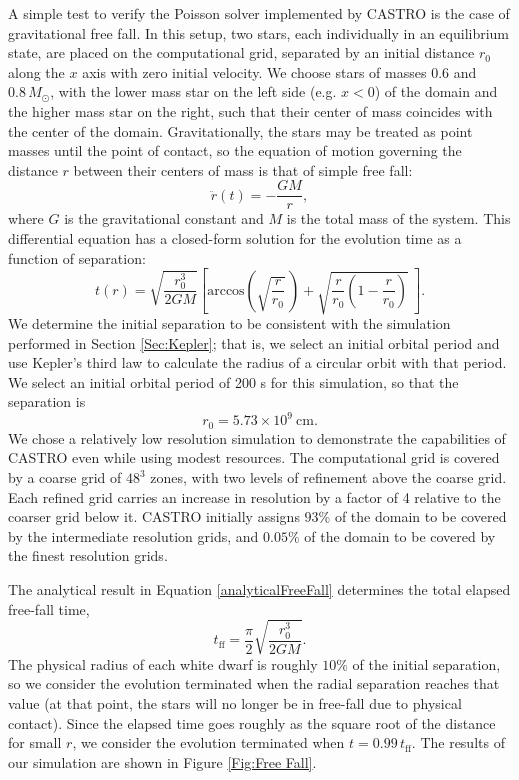 \documentclass[12pt,preprint]{aastex}
\newcommand{\MarginPar}[1]{\marginpar{\vskip-\baselineskip\raggedright\tiny\sffamily\hrule\smallskip{\color{red}#1}\par\smallskip\hrule}}
\begin{document}
A simple test to verify the Poisson solver implemented by CASTRO is
the case of gravitational free fall. In this setup, two stars, each
individually in an equilibrium state, are placed on the computational
grid, separated by an initial distance $r_0$ along the $x$ axis with
zero initial velocity. We choose stars of masses $0.6$ and $0.8\,
M_\odot$, with the lower mass star on the left side (e.g. $x < 0$) of
the domain and the higher mass star on the right, such that their
center of mass coincides with the center of the
domain. Gravitationally, the stars may be treated as point masses
until the point of contact, so the equation of motion governing the
distance $r$ between their centers of mass is that of simple free
fall:
\begin{equation}
  \ddot{r}(t) = - \frac{GM}{r},
\end{equation}
where $G$ is the gravitational constant and $M$ is the total mass of
the system. This differential equation has a closed-form solution for
the evolution time as a function of separation:
\begin{equation}
  t(r) = \sqrt{\frac{r_0^3}{2GM}} \left[ \text{arccos}\left(\sqrt{\frac{r}{r_0}}\,\right) + \sqrt{\frac{r}{r_0} \left(1 - \frac{r}{r_0}\right)}\ \right]. \label{analyticalFreeFall}
\end{equation} \MarginPar{is there a reference for this? or did you derive it?}
We determine the initial separation to be consistent with the
simulation performed in Section \ref{Sec:Kepler}; that is, we select
an initial orbital period and use Kepler's third law to calculate the
radius of a circular orbit with that period. We select an initial
orbital period of 200 s for this simulation, so that the separation is
\[
  r_0 = 5.73 \times 10^{9}\ \text{cm}.
\]
We chose a relatively low resolution simulation to demonstrate the
capabilities of CASTRO even while using modest resources. The
computational grid is covered by a coarse grid of $48^3$ zones, with
two levels of refinement above the coarse grid. Each refined grid
carries an increase in resolution by a factor of 4 relative to the
coarser grid below it. CASTRO initially assigns $93\%$ of the domain
to be covered by the intermediate resolution grids, and $0.05\%$ of
the domain to be covered by the finest resolution grids.

The analytical result in Equation \ref{analyticalFreeFall} determines
the total elapsed free-fall time,
\[
  t_{\text{ff}} = \frac{\pi}{2} \sqrt{\frac{r_0^3}{2GM}}.
\]
The physical radius of each white dwarf is roughly $10\%$ of the
initial separation, so we consider the evolution terminated when the
radial separation reaches that value (at that point, the stars will no
longer be in free-fall due to physical contact). Since the elapsed
time goes roughly as the square root of the distance for small $r$, we
consider the evolution terminated when $t = 0.99\, t_{\text{ff}}$. The
results of our simulation are shown in Figure \ref{Fig:Free Fall}.
\end{document}
